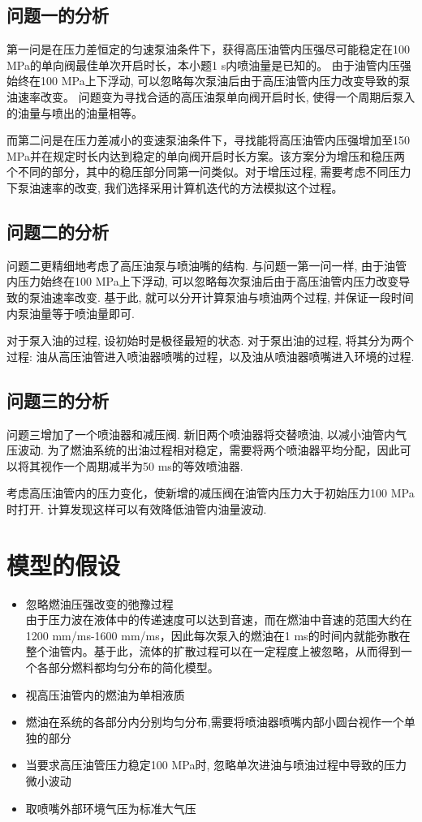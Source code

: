 \documentclass{cumcmthesis}
\begin{document}
\subsection{问题一的分析}
第一问是在压力差恒定的匀速泵油条件下，获得高压油管内压强尽可能稳定在100 MPa的单向阀最佳单次开启时长，本小题1 s内喷油量是已知的。 由于油管内压强始终在100 MPa上下浮动, 可以忽略每次泵油后由于高压油管内压力改变导致的泵油速率改变。 问题变为寻找合适的高压油泵单向阀开启时长, 使得一个周期后泵入的油量与喷出的油量相等。

而第二问是在压力差减小的变速泵油条件下，寻找能将高压油管内压强增加至150 MPa并在规定时长内达到稳定的单向阀开启时长方案。该方案分为增压和稳压两个不同的部分，其中的稳压部分同第一问类似。对于增压过程, 需要考虑不同压力下泵油速率的改变, 我们选择采用计算机迭代的方法模拟这个过程。
\subsection{问题二的分析}
问题二更精细地考虑了高压油泵与喷油嘴的结构. 与问题一第一问一样, 由于油管内压力始终在100 MPa上下浮动, 可以忽略每次泵油后由于高压油管内压力改变导致的泵油速率改变. 基于此, 就可以分开计算泵油与喷油两个过程, 并保证一段时间内泵油量等于喷油量即可. 

对于泵入油的过程, 设初始时是极径最短的状态. 对于泵出油的过程, 将其分为两个过程: 油从高压油管进入喷油器喷嘴的过程，以及油从喷油器喷嘴进入环境的过程. 
\subsection{问题三的分析}
问题三增加了一个喷油器和减压阀. 新旧两个喷油器将交替喷油, 以减小油管内气压波动. 为了燃油系统的出油过程相对稳定，需要将两个喷油器平均分配，因此可以将其视作一个周期减半为50 ms的等效喷油器. 

考虑高压油管内的压力变化，使新增的减压阀在油管内压力大于初始压力100 MPa时打开. 计算发现这样可以有效降低油管内油量波动.



\section{模型的假设}
\begin{itemize}
    \item 忽略燃油压强改变的弛豫过程\\
        由于压力波在液体中的传递速度可以达到音速\cite{1}，而在燃油中音速的范围大约在1200 mm/ms-1600 mm/ms，因此每次泵入的燃油在1 ms的时间内就能弥散在整个油管内。基于此，流体的扩散过程可以在一定程度上被忽略，从而得到一个各部分燃料都均匀分布的简化模型。
    \item 视高压油管内的燃油为单相液质\cite{1}
    \item 燃油在系统的各部分内分别均匀分布,需要将喷油器喷嘴内部小圆台视作一个单独的部分
    \item 当要求高压油管压力稳定100 MPa时, 忽略单次进油与喷油过程中导致的压力微小波动
    \item 取喷嘴外部环境气压为标准大气压
\end{itemize}
\end{document}
